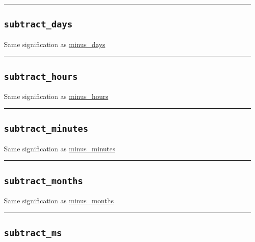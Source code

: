\documentclass[]{book}
\theoremstyle{definition}
\theoremstyle{definition}
\theoremstyle{definition}
\theoremstyle{remark}
\begin{document}
\begin{center}\rule{0.5\linewidth}{\linethickness}\end{center}

\subsection{\texorpdfstring{\texttt{subtract\_days}}{subtract\_days}}\label{subtract_days}

Same signification as \href{OperatorsIM\#minus_days}{minus\_days}

\begin{center}\rule{0.5\linewidth}{\linethickness}\end{center}

\subsection{\texorpdfstring{\texttt{subtract\_hours}}{subtract\_hours}}\label{subtract_hours}

Same signification as \href{OperatorsIM\#minus_hours}{minus\_hours}

\begin{center}\rule{0.5\linewidth}{\linethickness}\end{center}

\subsection{\texorpdfstring{\texttt{subtract\_minutes}}{subtract\_minutes}}\label{subtract_minutes}

Same signification as \href{OperatorsIM\#minus_minutes}{minus\_minutes}

\begin{center}\rule{0.5\linewidth}{\linethickness}\end{center}

\subsection{\texorpdfstring{\texttt{subtract\_months}}{subtract\_months}}\label{subtract_months}

Same signification as \href{OperatorsIM\#minus_months}{minus\_months}

\begin{center}\rule{0.5\linewidth}{\linethickness}\end{center}

\subsection{\texorpdfstring{\texttt{subtract\_ms}}{subtract\_ms}}\label{subtract_ms}
\end{document}

